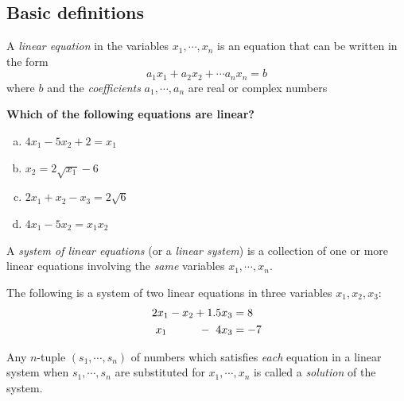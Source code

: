 \documentclass[12pt,letterpaper,reqno]{article}
\numberwithin{equation}{section}
\newcommand{\ti}[1]{\textit{#1}}
\begin{document}
\subsection{Basic definitions}
\begin{defn}\label{def:linear_equation}
	A \ti{linear equation} in the variables $x_1,\cdots, x_n$ is an equation that can be written in the form
\begin{equation}
	a_1 x_1+a_2 x_2+\cdots a_n x_n=b
\end{equation}
where $b$ and the \ti{coefficients} $a_1,\cdots, a_n$ are real or complex numbers	
\end{defn}

\begin{exercise}
\bf Which of the following equations are linear?
\begin{enumerate}[(a)]
	\item $4x_1-5x_2+2=x_1$
	\item $x_2=2\sqrt{x_1}-6$
	\item $2x_1+x_2-x_3=2\sqrt{6}$ 
	\item $4x_1-5x_2=x_1x_2$ 
\end{enumerate}
\end{exercise}

\begin{defn}\label{eq:system_of_linear_equations}
	A \ti{system of linear equations} (or a \ti{linear system}) is a collection of one or more linear equations involving the \ti{same} variables $x_1, \cdots, x_n$.	
\end{defn}

\begin{example}
The following is a system of two linear equations in three variables $x_1,x_2,x_3$:
\begin{equation}\label{eq:system}
\begin{split}
	2x_1-x_2+1.5x_3&=8 \\
	x_1  \hspace{1.0cm} - \ 4x_3&=-7
\end{split}
\end{equation}	
\end{example}

\begin{defn}[Solution]\label{def:solution}
	Any $n$-tuple $(s_1,\cdots,s_n)$ of numbers which satisfies \ti{each} equation in a linear system when $s_1,\cdots,s_n$ are substituted for $x_1,\cdots,x_n$ is called a \ti{solution} of the system.
\end{defn}
\end{document}
